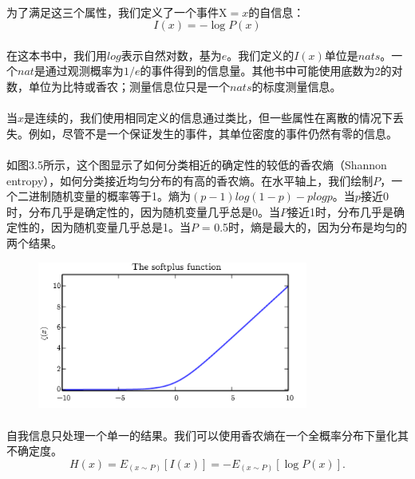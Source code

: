 \documentclass{article}
\begin{document}
   \paragraph{}
   为了满足这三个属性，我们定义了一个事件$\mathrm{X} = x$的自信息：
   \begin{equation}
     I(x)=-\log{P(x)}\tag{3.48}
   \end{equation}
   \paragraph{}
   在这本书中，我们用$log$表示自然对数，基为$e$。我们定义的$I(x)$单位是$nats$。一个$nat$是通过观测概率为$1 /e$的事件得到的信息量。其他书中可能使用底数为2的对数，单位为比特或香农；测量信息位只是一个$nats$的标度测量信息。
   \paragraph{}
   当$x$是连续的，我们使用相同定义的信息通过类比，但一些属性在离散的情况下丢失。例如，尽管不是一个保证发生的事件，其单位密度的事件仍然有零的信息。
   \paragraph{}
   如图3.5所示，这个图显示了如何分类相近的确定性的较低的香农熵（Shannon entropy），如何分类接近均匀分布的有高的香农熵。在水平轴上，我们绘制$P$，一个二进制随机变量的概率等于1。熵为$(p- 1) log(1- p) - p log p$。当$p$接近0时，分布几乎是确定性的，因为随机变量几乎总是0。当$P$接近1时，分布几乎是确定性的，因为随机变量几乎总是1。当$P$ = 0.5时，熵是最大的，因为分布是均匀的两个结果。
   \begin{figure}[!htb]
   \centering
   \centerline{\includegraphics[width=3.5in]{fig/chap3/3_4.png}}
   \label*{图:3.5}
   \end{figure}
   \paragraph{}
   自我信息只处理一个单一的结果。我们可以使用香农熵在一个全概率分布下量化其不确定度。
   \begin{equation}
     H(x)=E_{(x\sim P)}[I(x)]=-E_{(x\sim P)}[\log{P(x)}]. \tag{3.49}
   \end{equation}
\end{document}
